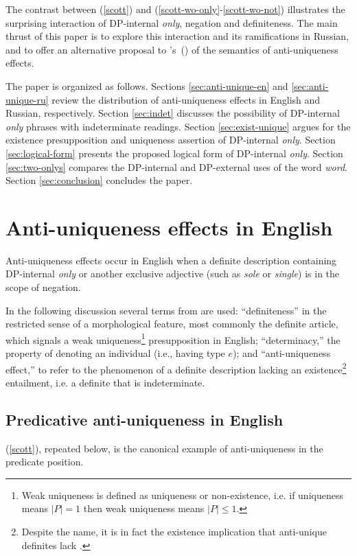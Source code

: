\documentclass{article}
\newcommand{\citegen}[1]{\citeauthor{#1}'s~(\citeyear{#1})}
\begin{document}
The contrast between (\ref{scott}) and (\ref{scott-wo-only}-\ref{scott-wo-not}) illustrates the surprising interaction of DP-internal \textit{only}, negation and definiteness. The main thrust of this paper is to explore this interaction and its ramifications in Russian, and to offer an alternative proposal to \citegen{cb2015} of the semantics of anti-uniqueness effects.

The paper is organized as follows. Sections \ref{sec:anti-unique-en} and \ref{sec:anti-unique-ru} review the distribution of anti-uniqueness effects in English and Russian, respectively. Section \ref{sec:indet} discusses the possibility of DP-internal \textit{only} phrases with indeterminate readings. Section \ref{sec:exist-unique} argues for the existence presupposition and uniqueness assertion of DP-internal \textit{only}. Section \ref{sec:logical-form} presents the proposed logical form of DP-internal \textit{only}. Section \ref{sec:two-onlys} compares the DP-internal and DP-external uses of the word \textit{word}. Section \ref{sec:conclusion} concludes the paper.


\section{Anti-uniqueness effects in English \label{sec:anti-unique-en}}
Anti-uniqueness effects occur in English when a definite description containing DP-internal \textit{only} or another exclusive adjective (such as \textit{sole} or \textit{single}) is in the scope of negation.

In the following discussion several terms from \citet{cb2015} are used: ``definiteness'' in the restricted sense of a morphological feature, most commonly the definite article, which signals a weak uniqueness\footnote{Weak uniqueness is defined as uniqueness or non-existence, i.e. if uniqueness means $|P| = 1$ then weak uniqueness means $|P| \le 1$.} presupposition in English; ``determinacy,'' the property of denoting an individual (i.e., having type $e$); and ``anti-uniqueness effect,'' to refer to the phenomenon of a definite description lacking an existence\footnote{Despite the name, it is in fact the existence implication that anti-unique definites lack \citep[p. 385]{cb2015}.} entailment, i.e. a definite that is indeterminate.

\subsection{Predicative anti-uniqueness in English}
(\ref{scott}), repeated below, is the canonical example of anti-uniqueness in the predicate position.
\end{document}
